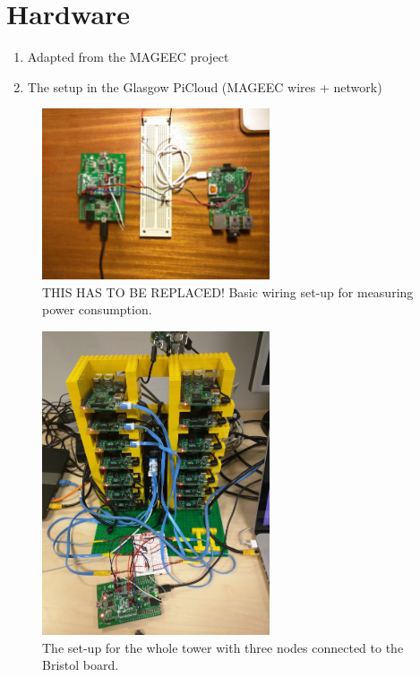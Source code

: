 \documentclass{l4proj}
\begin{document}
\section{Hardware}
\begin{enumerate}
	\item Adapted from the MAGEEC project
	\item The setup in the Glasgow PiCloud (MAGEEC wires + network)
\end{enumerate}
\begin{figure}[!ht]
  \caption{THIS HAS TO BE REPLACED! Basic wiring set-up for measuring power consumption.}
  \centering
    \includegraphics[width=0.6\textwidth]{figures/init_setup}
\end{figure}
\begin{figure}[!ht]
  \caption{The set-up for the whole tower with three nodes connected to the Bristol board.}
  \centering
    \includegraphics[width=0.6\textwidth]{figures/tower_setup}
\end{figure}
\end{document}
